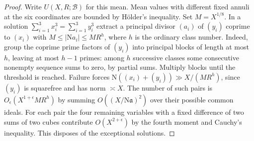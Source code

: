 \documentclass[11pt,letterpaper]{article}
\theoremstyle{definition}
\numberwithin{equation}{section}
\begin{document}
\begin{proof}
Write $U(X,R;\mathcal B)$ for this mean. Mean values with different
fixed annuli at the six coordinates are bounded by H\"older's
inequality. Set $M=X^{1/8}$. In a solution
$\sum_{i=1}^3 x_i^3=\sum_{i=1}^3 y_i^3$ extract a principal
divisor $(a_i)$ of $(y_i)$ coprime to $(x_i)$ with
$M\le |\mathrm N a_i|\le M R^h$, where $h$ is the ordinary
class number. Indeed, group the coprime prime factors of $(y_i)$
into principal blocks of length at most $h$, leaving at most
$h-1$ primes: among $h$ successive classes some consecutive
nonempty sequence sums to zero, by partial sums. Multiply blocks
until the threshold is reached. Failure forces
$\mathrm N((x_i)+(y_i))\gg X/(MR^h)$, since $(y_i)$ is squarefree
and has norm $\asymp X$. The number of such pairs is
$O_\epsilon(X^{1+\epsilon}MR^h)$ by summing
$O((X/\mathrm N\mathfrak a)^2)$ over their possible common ideals.
For each pair the four remaining variables with a fixed difference
of two sums of two cubes contribute $O(X^{2+\epsilon})$ by the
fourth moment and Cauchy's inequality. This disposes of the
exceptional solutions.


\end{proof}
\end{document}
